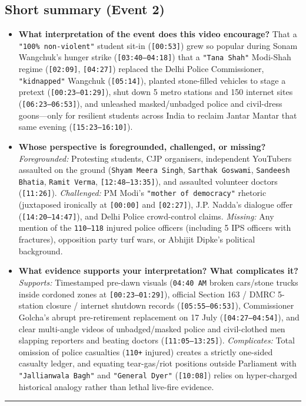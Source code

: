 \documentclass[10pt,a4paper]{article}
\begin{document}
\subsection*{Short summary (Event 2)}
\begin{itemize}[leftmargin=1.5em, itemsep=3pt, topsep=4pt]
  \item \textbf{What interpretation of the event does this video encourage?} That a \texttt{"100\% non-violent"} student sit-in (\texttt{[00:53]}) grew so popular during Sonam Wangchuk's hunger strike (\texttt{[03:40--04:18]}) that a \texttt{"Tana Shah"} Modi-Shah regime (\texttt{[02:09]}, \texttt{[04:27]}) replaced the Delhi Police Commissioner, \texttt{"kidnapped"} Wangchuk (\texttt{[05:14]}), planted stone-filled vehicles to stage a pretext (\texttt{[00:23--01:29]}), shut down 5 metro stations and 150 internet sites (\texttt{[06:23--06:53]}), and unleashed masked/unbadged police and civil-dress goons---only for resilient students across India to reclaim Jantar Mantar that same evening (\texttt{[15:23--16:10]}).
  \item \textbf{Whose perspective is foregrounded, challenged, or missing?} \textit{Foregrounded:} Protesting students, CJP organisers, independent YouTubers assaulted on the ground (\texttt{Shyam Meera Singh}, \texttt{Sarthak Goswami}, \texttt{Sandeesh Bhatia}, \texttt{Ramit Verma}, \texttt{[12:48--13:35]}), and assaulted volunteer doctors (\texttt{[11:26]}). \textit{Challenged:} PM Modi's \texttt{"mother of democracy"} rhetoric (juxtaposed ironically at \texttt{[00:00]} and \texttt{[02:27]}), J.P. Nadda's dialogue offer (\texttt{[14:20--14:47]}), and Delhi Police crowd-control claims. \textit{Missing:} Any mention of the \texttt{110--118} injured police officers (including 5 IPS officers with fractures), opposition party turf wars, or Abhijit Dipke's political background.
  \item \textbf{What evidence supports your interpretation? What complicates it?} \textit{Supports:} Timestamped pre-dawn visuals (\texttt{04:40 AM} broken cars/stone trucks inside cordoned zones at \texttt{[00:23--01:29]}), official Section 163 / DMRC 5-station closure / internet shutdown records (\texttt{[05:55--06:53]}), Commissioner Golcha's abrupt pre-retirement replacement on 17 July (\texttt{[04:27--04:54]}), and clear multi-angle videos of unbadged/masked police and civil-clothed men slapping reporters and beating doctors (\texttt{[11:05--13:25]}). \textit{Complicates:} Total omission of police casualties (\texttt{110+} injured) creates a strictly one-sided casualty ledger, and equating tear-gas/riot positions outside Parliament with \texttt{"Jallianwala Bagh"} and \texttt{"General Dyer"} (\texttt{[10:08]}) relies on hyper-charged historical analogy rather than lethal live-fire evidence.
\end{itemize}
\vspace{4pt}\noindent\rule{\textwidth}{0.4pt}\vspace{4pt}
\end{document}
